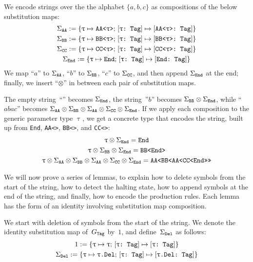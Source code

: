\documentclass[../generics]{subfiles}
\begin{document}
\begin{definition}
We encode strings over the the alphabet $\{a,b,c\}$ as compositions of the below substitution maps:
\begin{gather*}
\Sigma_{\texttt{AA}} := \{\texttt{$\uptau$} \mapsto \texttt{AA<$\uptau$>};\,[\texttt{$\uptau$:~Tag}] \mapsto [\texttt{AA<$\uptau$>:~Tag}]\}\\
\Sigma_{\texttt{BB}} := \{\texttt{$\uptau$} \mapsto \texttt{BB<$\uptau$>};\,[\texttt{$\uptau$:~Tag}] \mapsto [\texttt{BB<$\uptau$>:~Tag}]\}\\
\Sigma_{\texttt{CC}} := \{\texttt{$\uptau$} \mapsto \texttt{CC<$\uptau$>};\,[\texttt{$\uptau$:~Tag}] \mapsto [\texttt{CC<$\uptau$>:~Tag}]\}\\
\Sigma_{\texttt{End}} := \{\texttt{$\uptau$} \mapsto \texttt{End};\,[\texttt{$\uptau$:~Tag}] \mapsto [\texttt{End:~Tag}]\}
\end{gather*}
We map ``$a$'' to $\Sigma_{\texttt{AA}}$, ``$b$'' to $\Sigma_{\texttt{BB}}$, ``$c$'' to $\Sigma_{\texttt{CC}}$, and then append $\Sigma_{\texttt{End}}$ at the end; finally, we insert ``$\otimes$'' in between each pair of substitution maps.
\end{definition}

\begin{example}
The empty string~``'' becomes $\Sigma_{\texttt{End}}$, the string~''$b$'' becomes $\Sigma_{\texttt{BB}}\otimes\Sigma_{\texttt{End}}$, while ``$abac$'' becomes $\Sigma_{\texttt{AA}}\otimes\Sigma_{\texttt{BB}}\otimes\Sigma_{\texttt{AA}}\otimes\Sigma_{\texttt{CC}}\otimes\Sigma_{\texttt{End}}$.
If we apply each composition to the generic parameter type $\uptau$, we get a concrete type that encodes the string, built up from \texttt{End}, \texttt{AA<>}, \texttt{BB<>}, and \texttt{CC<>}:
\begin{gather*}
\uptau\otimes\Sigma_{\texttt{End}} = \texttt{End}\\
\uptau\otimes\Sigma_{\texttt{BB}}\otimes\Sigma_{\texttt{End}} = \texttt{BB<End>}\\
\uptau\otimes\Sigma_{\texttt{AA}}\otimes\Sigma_{\texttt{BB}}\otimes\Sigma_{\texttt{AA}}\otimes\Sigma_{\texttt{CC}}\otimes\Sigma_{\texttt{End}} = \texttt{AA<BB<AA<CC<End>>>>}
\end{gather*}
\end{example}

We will now prove a series of lemmas, to explain how to delete symbols from the start of the string, how to detect the halting state, how to append symbols at the end of the string, and finally, how to encode the production rules. Each lemma has the form of an identity involving substitution map composition.

We start with deletion of symbols from the start of the string. We denote the identity substitution map of~$G_\texttt{Tag}$ by~$1$, and define~$\Sigma_{\texttt{Del}}$ as follows:
\begin{gather*}
1 := \{\texttt{$\uptau$} \mapsto \texttt{$\uptau$};\,[\texttt{$\uptau$:~Tag}] \mapsto [\texttt{$\uptau$:~Tag}]\}\\
\Sigma_{\texttt{Del}} := \{\texttt{$\uptau$} \mapsto \texttt{$\uptau$.Del};\,[\texttt{$\uptau$:~Tag}] \mapsto [\texttt{$\uptau$.Del:~Tag}]\}
\end{gather*}
\end{document}
